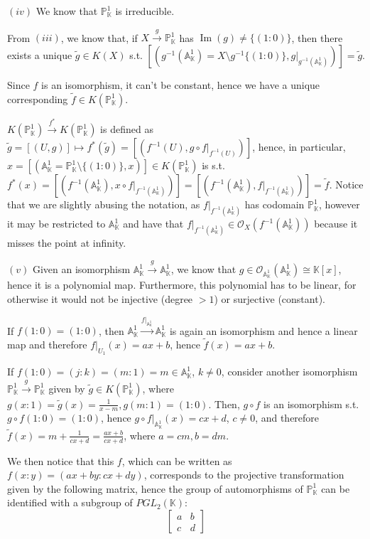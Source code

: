 \documentclass{article}
\newcommand{\numberset}{\mathbb}
\newcommand{\K}{\numberset{K}}
\newcommand{\A}{\mathbb{A}}
\newcommand{\Ps}{\mathbb{P}}
\DeclareMathOperator{\Ima}{Im}
\begin{document}
$(iv)$ We know that $\Ps^1_{\K}$ is irreducible.

From $(iii)$, we know that, if $X\xrightarrow{g}\Ps^1_{\K}$ has $\Ima(g)\neq\{(1:0)\}$, then there exists a unique $\tilde{g}\in K(X)$ s.t. $[(g^{-1}(\A^1_{\K})=X\setminus g^{-1}\{(1:0)\},g|_{g^{-1}(\A^1_{\K})})]=\tilde{g}$.

Since $f$ is an isomorphism, it can't be constant, hence we have a unique corresponding $\tilde{f}\in K(\Ps^1_{\K})$.

$K(\Ps^1_{\K})\xrightarrow{f^*} K(\Ps^1_{\K})$ is defined as $\tilde{g}=[(U,g)]\mapsto f^*(\tilde{g})=[(f^{-1}(U),g\circ f|_{f^{-1}(U)})]$, hence, in particular, $x=[(\A^1_{\K}=\Ps^1_{\K}\setminus\{(1:0)\},x)]\in K(\Ps^1_{\K})$ is s.t. $f^*(x)=[(f^{-1}(\A^1_{\K}),x\circ f|_{f^{-1}(\A^1_{\K})})]=[(f^{-1}(\A^1_{\K}),f|_{f^{-1}(\A^1_{\K})})]=\tilde{f}$. Notice that we are slightly abusing the notation, as $f|_{f^{-1}(\A^1_{\K})}$ has codomain $\Ps^1_{\K}$, however it may be restricted to $\A^1_{\K}$ and have that $f|_{f^{-1}(\A^1_{\K})}\in\mathcal{O}_X(f^{-1}(\A^1_{\K}))$ because it misses the point at infinity.

$(v)$ Given an isomorphism $\A^1_{\K}\xrightarrow{g}\A^1_{\K}$, we know that $g\in\mathcal{O}_{\A^1_{\K}}(\A^1_{\K})\cong\K[x]$, hence it is a polynomial map. Furthermore, this polynomial has to be linear, for otherwise it would not be injective (degree $>1$) or surjective (constant).

If $f(1:0)=(1:0)$, then $\A^1_{\K}\xrightarrow{f|_{\A^1_{\K}}}\A^1_{\K}$ is again an isomorphism and hence a linear map and therefore $f|_{U_1}(x)=ax+b$, hence $\tilde{f}(x)=ax+b$.

If $f(1:0)=(j:k)=(m:1)=m\in\A^1_{\K}$, $k\neq 0$, consider another isomorphism $\Ps^1_{\K}\xrightarrow{g}\Ps^1_{\K}$ given by $\tilde{g}\in K(\Ps^1_{\K})$, where $g(x:1)=\tilde{g}(x)=\frac{1}{x-m},g(m:1)=(1:0)$. Then, $g\circ f$ is an isomorphism s.t. $g\circ f(1:0)=(1:0)$, hence $g\circ f|_{\A^1_{\K}}(x)=cx+d$, $c\neq 0$, and therefore $\tilde{f}(x)=m+\frac{1}{cx+d}=\frac{ax+b}{cx+d}$, where $a=cm,b=dm$.

We then notice that this $f$, which can be written as $f(x:y)=(ax+by:cx+dy)$, corresponds to the projective transformation given by the following matrix, hence the group of automorphisms of $\Ps^1_{\K}$ can be identified with a subgroup of $PGL_2(\K)$:
\[
  \begin{bmatrix}
    a & b \\
    c & d
  \end{bmatrix}
\]
\end{document}
